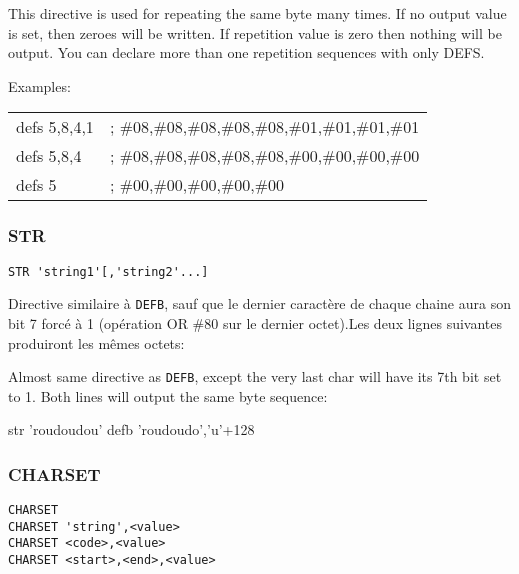 \begin{xen}
This directive is used for repeating the same byte many times.
If no output value is set, then zeroes will be written.
If repetition value is zero then nothing will be output.
You can declare more than one repetition sequences with only DEFS.
\end{xen}

Examples:
\begin{code}
\begin{tabular}{ll}
defs 5,8,4,1 &; \#08,\#08,\#08,\#08,\#08,\#01,\#01,\#01,\#01 \\
defs 5,8,4   &; \#08,\#08,\#08,\#08,\#08,\#00,\#00,\#00,\#00 \\
defs 5       &; \#00,\#00,\#00,\#00,\#00
\end{tabular}
\end{code}


\subsubsection{STR}

\begin{verbatim}
STR 'string1'[,'string2'...]
\end{verbatim}

\begin{xfr}
Directive similaire à \texttt{DEFB}, sauf que le dernier caractère de chaque chaine aura son bit 7 forcé à 1 (opération OR \#80 sur le dernier octet).Les deux lignes suivantes produiront les mêmes octets:
\end{xfr}

\begin{xen}
Almost same directive as \texttt{DEFB}, except the very last char will have its 7th bit set to 1.
Both lines will output the same byte sequence:
\end{xen}

\begin{code}
str  'roudoudou'
defb 'roudoudo','u'+128
\end{code}

\subsubsection{CHARSET}

\begin{verbatim}
CHARSET
CHARSET 'string',<value>
CHARSET <code>,<value>
CHARSET <start>,<end>,<value>
\end{verbatim}

